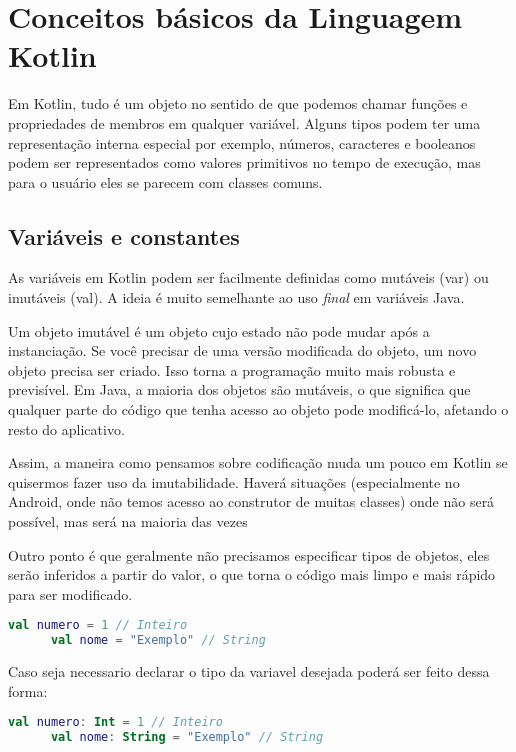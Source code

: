 

\chapter{ Conceitos b\'{a}sicos da Linguagem Kotlin}

Em Kotlin, tudo é um objeto no sentido de que 
podemos chamar funções e propriedades de membros
 em qualquer variável. Alguns tipos podem ter uma 
 representação interna especial por exemplo, 
 números, caracteres e booleanos podem ser 
 representados como valores primitivos no tempo 
 de execução, mas para o usuário eles se parecem
 com classes comuns.

    \section{Vari\'{a}veis e constantes}
      As variáveis em Kotlin podem ser facilmente 
    definidas como mutáveis (var) ou imutáveis (val).
    A ideia é muito semelhante ao uso \emph{final} em variáveis Java.
     
    Um objeto imutável é um objeto cujo estado não pode mudar 
    após a instanciação. Se você precisar de uma versão 
    modificada do objeto, um novo objeto precisa ser criado.
    Isso torna a programação muito mais robusta e previsível. 
    Em Java, a maioria dos objetos são mutáveis, o que significa
    que qualquer parte do código que tenha acesso ao objeto pode 
    modificá-lo, afetando o resto do aplicativo.

    Assim, a maneira como pensamos sobre codificação muda um pouco em Kotlin 
    se quisermos fazer uso da imutabilidade. Haverá situações (especialmente no Android,
    onde não temos acesso ao construtor de muitas classes) onde não será 
    possível, mas será na maioria das vezes

    Outro ponto é que geralmente não precisamos 
    especificar tipos de objetos, eles serão inferidos a partir do 
    valor, o que torna o código mais limpo e mais rápido para ser modificado.
    \begin{lstlisting}[label={lst:example1}, language=Kotlin]
      val numero = 1 // Inteiro
      val nome = "Exemplo" // String  
    \end{lstlisting}
    Caso seja necessario declarar o tipo da variavel desejada poderá ser feito dessa forma:
    \begin{lstlisting}[label={lst:example1}, language=Kotlin]
      val numero: Int = 1 // Inteiro
      val nome: String = "Exemplo" // String  
    \end{lstlisting}


